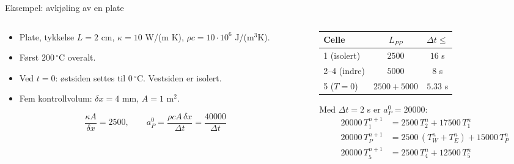 \documentclass[11pt,aspectratio=169]{beamer}
\begin{document}
\begin{frame}{Eksempel: avkjøling av en plate}
\begin{columns}[c]
\begin{column}{0.5\textwidth}
\begin{itemize}
\item Plate, tykkelse $L = 2$ cm, $\kappa = 10$ W/(m K), $\rho c = 10\cdot10^6$ J/(m$^3$K).
\item Først $200\,^\circ$C overalt.
\item Ved $t=0$: østsiden settes til $0\,^\circ$C. Vestsiden er isolert.
\item Fem kontrollvolum: $\delta x = 4$ mm, $A=1$ m$^2$.
\end{itemize}
\[
\frac{\kappa A}{\delta x} = 2500, \qquad a_P^0 = \frac{\rho cA\,\delta x}{\Delta t} = \frac{40000}{\Delta t}
\]
\end{column}
\begin{column}{0.48\textwidth}
\small
\begin{tabular}{lcc}
\toprule
Celle & $L_{PP}$ & $\Delta t \le$ \\
\midrule
1 (isolert) & $2500$ & $16$ s \\
2--4 (indre) & $5000$ & $8$ s \\
5 ($T=0$) & $2500 + 5000$ & $5.33$ s \\
\bottomrule
\end{tabular}
\medskip

Med $\Delta t = 2$ s er $a_P^0 = 20000$:
\[
\begin{aligned}
20000\,T_1^{n+1} &= 2500\,T_2^n + 17500\,T_1^n\\
20000\,T_P^{n+1} &= 2500\,(T_W^n + T_E^n) + 15000\,T_P^n\\
20000\,T_5^{n+1} &= 2500\,T_4^n + 12500\,T_5^n
\end{aligned}
\]
\end{column}
\end{columns}
\end{frame}
\end{document}
